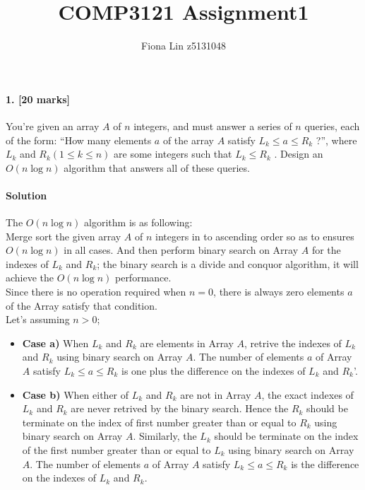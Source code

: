 \documentclass[a4paper]{scrartcl}
\title{COMP3121 Assignment1}
\author{Fiona Lin z5131048}
\begin{document}
\maketitle

\paragraph{1. [20 marks]}
\label{sec:Question 1}
You're given an array $A$ of $n$ integers, and must answer a series of $n$ queries, each of the form: “How many elements $a$ of the array $A$ satisfy $L_k \leq a \leq R_k$ ?”, where $L_k$ and $R_k (1 \leq k \leq n)$ are some integers such that $L_k \leq R_k$ . Design an $O(n \log{n})$ algorithm that answers all of these queries.
\paragraph{Solution}
The $O(n\log{n})$ algorithm is as following:\\
Merge sort the given array $A$ of $n$ integers in to ascending order so as to ensures $O(n\log{n})$ in all cases. And then perform binary search on Array $A$ for the indexes of $L_k$ and $R_k$; the binary search is a divide and conquor algorithm, it will achieve the $O(n\log{n})$ performance.\\
Since there is no operation required when $n = 0$, there is always zero elements $a$ of the Array satisfy that condition.\\
Let's assuming $n > 0$;
\begin{itemize}
  \item {\bfseries Case a)} When $L_k$ and $R_k$ are elements in Array $A$, retrive the indexes of $L_k$ and $R_k$ using binary search on Array $A$.
  The number of elements $a$ of Array $A$ satisfy $L_k \leq a \leq R_k$ is one plus the difference on the indexes of $L_k$ and $R_k$'.
  \item {\bfseries Case b)} When either of $L_k$ and $R_k$ are not in Array $A$, the exact indexes of $L_k$ and $R_k$ are never retrived by the binary search. Hence the $R_k$ should be terminate on the index of first number greater than or equal to $R_k$ using binary search on Array $A$. Similarly, the $L_k$ should be terminate on the index of the first number greater than or equal to $L_k$ using binary search on Array $A$.
  The number of elements $a$ of Array $A$ satisfy $L_k \leq a \leq R_k$ is the difference on the indexes of $L_k$ and $R_k$.
\end{itemize}
\end{document}
